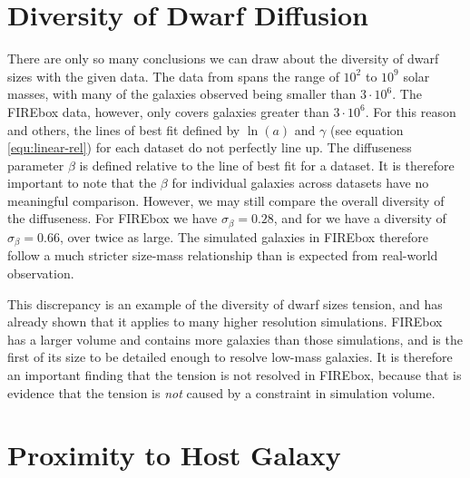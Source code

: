 \section{Diversity of Dwarf Diffusion}

There are only so many conclusions we can draw about the diversity of dwarf sizes with the given data. The data from \cite{mcconnachieOBSERVEDPROPERTIESDWARF2012} spans the range of $10^2$ to $10^9$ solar masses, with many of the galaxies observed being smaller than $3 \cdot 10^6$. The FIREbox data, however, only covers galaxies greater than $3 \cdot 10^6$. For this reason and others, the lines of best fit defined by $\ln(a)$ and $\gamma$ (see equation \ref{equ:linear-rel}) for each dataset do not perfectly line up. %
The diffuseness parameter $\beta$ is defined relative to the line of best fit for a dataset. It is therefore important to note that the $\beta$ for individual galaxies across datasets have no meaningful comparison. However, we may still compare the overall diversity of the diffuseness. For FIREbox we have $\sigma_\beta = 0.28$, and for \cite{mcconnachieOBSERVEDPROPERTIESDWARF2012} we have a diversity of $\sigma_\beta = 0.66$, over twice as large. The simulated galaxies in FIREbox therefore follow a much stricter size-mass relationship than is expected from real-world observation.

This discrepancy is an example of the diversity of dwarf sizes tension, and \cite{salesBaryonicSolutionsChallenges2022} has already shown that it applies to many higher resolution simulations. FIREbox has a larger volume and contains more galaxies than those simulations, and is the first of its size to be detailed enough to resolve low-mass galaxies. It is therefore an important finding that the tension is not resolved in FIREbox, because that is evidence that the tension is \emph{not} caused by a constraint in simulation volume.


\section{Proximity to Host Galaxy}

